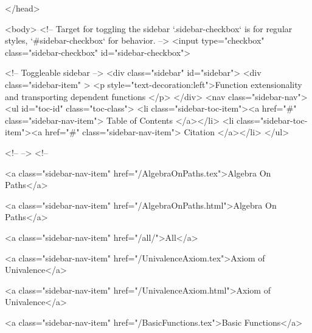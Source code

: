   
</head>




  <body>
    <!-- Target for toggling the sidebar `.sidebar-checkbox` is for regular
     styles, `#sidebar-checkbox` for behavior. -->
<input type="checkbox" class="sidebar-checkbox" id="sidebar-checkbox">

<!-- Toggleable sidebar -->
<div class="sidebar" id="sidebar">
  <div class="sidebar-item" >
    <p style="text-decoration:left">Function extensionality and transporting dependent functions </p>
  </div>
  <nav class="sidebar-nav">
    <ul id="toc-id" class="toc-class">
  <li class="sidebar-toc-item"><a href="#" class="sidebar-nav-item"> Table of Contents </a></li>
  <li class="sidebar-toc-item"><a href="#" class="sidebar-nav-item"> Citation </a></li>
</ul>


    <!--  -->
    <!-- 
      
    
      
    
      
    
      
        
      
    
      
        
          <a class="sidebar-nav-item" href="/AlgebraOnPaths.tex">Algebra On Paths</a>
        
      
    
      
        
          <a class="sidebar-nav-item" href="/AlgebraOnPaths.html">Algebra On Paths</a>
        
      
    
      
        
          <a class="sidebar-nav-item" href="/all/">All</a>
        
      
    
      
        
          <a class="sidebar-nav-item" href="/UnivalenceAxiom.tex">Axiom of Univalence</a>
        
      
    
      
        
          <a class="sidebar-nav-item" href="/UnivalenceAxiom.html">Axiom of Univalence</a>
        
      
    
      
        
          <a class="sidebar-nav-item" href="/BasicFunctions.tex">Basic Functions</a>
        
      
    
      
        

